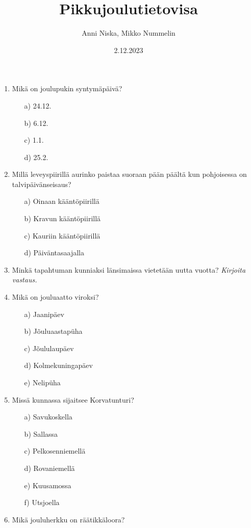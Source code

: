 \documentclass[a4paper,12pt,twoside]{article}
\begin{document}
\title{Pikkujoulutietovisa}
\author{Anni Niska, Mikko Nummelin}
\date{2.12.2023}
\maketitle
\begin{enumerate}
\item{Mikä on joulupukin syntymäpäivä?}
  \begin{itemize}
  \item[a)]{24.12.}
  \item[b)]{6.12.}
  \item[c)]{1.1.}
  \item[d)]{25.2.}
  \end{itemize}
\item{Millä leveyspiirillä aurinko paistaa suoraan pään päältä kun pohjoisessa on talvipäivänseisaus?}
  \begin{itemize}
  \item[a)]{Oinaan kääntöpiirillä}
  \item[b)]{Kravun kääntöpiirillä}
  \item[c)]{Kauriin kääntöpiirillä}
  \item[d)]{Päiväntasaajalla}
  \end{itemize}
\item{Minkä tapahtuman kunniaksi länsimaissa vietetään uutta vuotta?}
  \newline\emph{Kirjoita vastaus.}
\item{Mikä on jouluaatto viroksi?}
  \begin{itemize}
  \item[a)]{Jaanipäev}
  \item[b)]{Jõuluaastapüha}
  \item[c)]{Jõululaupäev}
  \item[d)]{Kolmekuningapäev}
  \item[e)]{Nelipüha}
  \end{itemize}
  \newpage
\item{Missä kunnassa sijaitsee Korvatunturi?}
  \begin{itemize}
  \item[a)]{Savukoskella}
  \item[b)]{Sallassa}
  \item[c)]{Pelkosenniemellä}
  \item[d)]{Rovaniemellä}
  \item[e)]{Kuusamossa}
  \item[f)]{Utsjoella}
  \end{itemize}
\item{Mikä jouluherkku on räätikkäloora?}

\end{enumerate}
\end{document}
